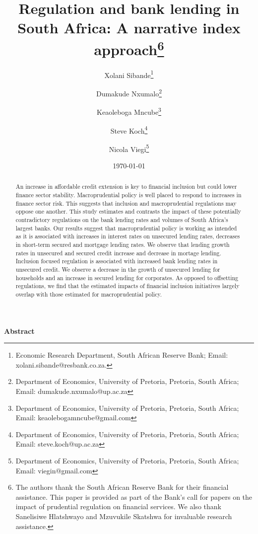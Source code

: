 \documentclass[
  letterpaper,
  DIV=11,
  numbers=noendperiod]{scrartcl}
\author{}
\date{}
\begin{document}
\title{Regulation and bank lending in South Africa: A narrative index approach\thanks{The authors thank the South African Reserve Bank for their financial assistance. This paper is provided as part of the Bank's call for papers on the impact of prudential regulation on financial services. We also thank Sanelisiwe Hlatshwayo and Mzuvukile Skatshwa for invaluable research assistance.}}

\author {Xolani Sibande\footnote{Economic Research Department, South African Reserve Bank; Email: xolani.sibande@resbank.co.za.} \and
Dumakude Nxumalo\footnote{Department of Economics, University of Pretoria, Pretoria, South Africa; Email: dumakude.nxumalo@up.ac.za} \and
Keaoleboga Mncube\footnote{Department of Economics, University of Pretoria, Pretoria, South Africa; Email: keaolebogamncube@gmail.com} \and
Steve Koch\footnote{Department of Economics, University of Pretoria, Pretoria, South Africa; Email: steve.koch@up.ac.za} \and
Nicola Viegi\footnote{Department of Economics, University of Pretoria, Pretoria, South Africa; Email: viegin@gmail.com}}

\date{\today}
\maketitle

\begin{center}
\textbf{Abstract}
\end{center}

\begin{abstract}
An increase in affordable credit extension is key to financial inclusion but could lower finance sector stability. Macroprudential policy is well placed to respond to increases in finance sector risk. This suggests that inclusion and macroprudential regulations may oppose one another. This study estimates and contrasts the impact of these potentially contradictory regulations on the bank lending rates and volumes of South Africa's largest banks. Our results suggest that macroprudential policy is working as intended as it is associated with increases in interest rates on unsecured lending rates, decreases in short-term secured and mortgage lending rates. We observe that lending growth rates in unsecured and secured credit increase and decrease in mortage lending. Inclusion focused regulation is associated with increased bank lending rates in unsecured credit. We observe a decrease in the growth of unsecured lending for households and an increase in secured lending for corporates. As opposed to offsetting regulations, we find that the estimated impacts of financial inclusion initiatives largely overlap with those estimated for macroprudential policy.
\end{abstract}
\end{document}
